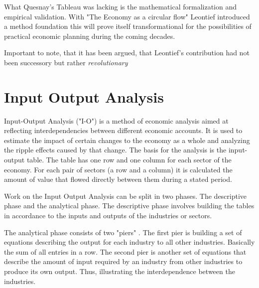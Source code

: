\documentclass[12pt,a4paper]{scrartcl}
\begin{document}
	What Quesnay's Tableau was lacking is the mathematical formalization and empirical validation.
	With "The Economy as a circular flow" \cite[]{Leontief1991} Leontief introduced a method foundation this will prove itself transformational for the possibilities of practical economic planning during the coming decades.
	
	Important to note, that it has been argued, that Leontief's contribution had not been successory but rather \textit{revolutionary} \cite[pp. 511 - 513]{Baumol2009}
	
	
	
		
	
	\section{Input Output Analysis} \label{analysis}

	Input-Output Analysis ("I-O") is a method of economic analysis aimed at reflecting interdependencies between different economic accounts. It is used to estimate the impact of certain changes to the economy as a whole and analyzing the ripple effects caused by that change. The basis for the analysis is the input-output table. The table has one row and one column for each sector of the economy. For each pair of sectors (a row and a column) it is calculated the amount of value that flowed directly between them during a stated period.
	
	Work on the Input Output Analysis can be split in two phases. The descriptive phase and the analytical phase. The descriptive phase involves building the tables in accordance to the inputs and outputs of the industries or sectors.
	
	The analytical phase consists of two "piers" . The first pier is building a set of equations describing the output for each industry to all other industries. Basically the sum of all entries in a row. The second pier is another set of equations that describe the amount of input required by an industry from other industries to produce its own output. Thus, illustrating the interdependence between the industries.
	
\end{document}
